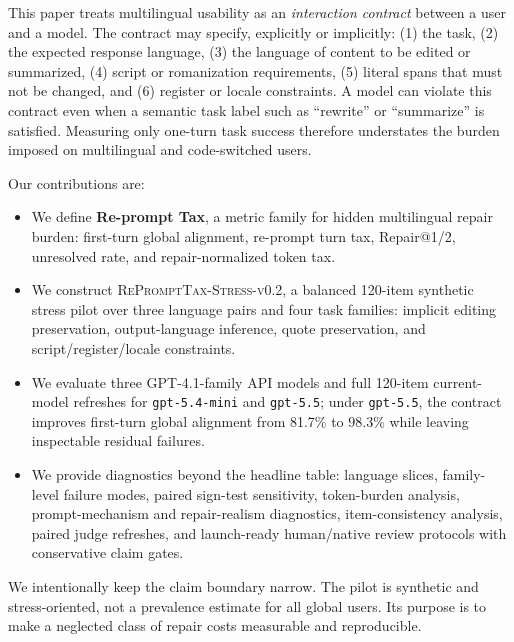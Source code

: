 This paper treats multilingual usability as an \emph{interaction contract}
between a user and a model. The contract may specify, explicitly or implicitly:
(1) the task, (2) the expected response language, (3) the language of content to
be edited or summarized, (4) script or romanization requirements, (5) literal
spans that must not be changed, and (6) register or locale constraints. A model
can violate this contract even when a semantic task label such as ``rewrite'' or
``summarize'' is satisfied. Measuring only one-turn task success therefore
understates the burden imposed on multilingual and code-switched users.

Our contributions are:
\begin{itemize}
    \item We define \textbf{Re-prompt Tax}, a metric family for hidden
    multilingual repair burden: first-turn global alignment, re-prompt turn tax,
    Repair@1/2, unresolved rate, and repair-normalized token tax.
    \item We construct \textsc{RePromptTax-Stress-v0.2}, a balanced 120-item
    synthetic stress pilot over three language pairs and four task families:
    implicit editing preservation, output-language inference, quote
    preservation, and script/register/locale constraints.
    \item We evaluate three GPT-4.1-family API models \citep{openai2025gpt41}
    and full 120-item current-model refreshes for \texttt{gpt-5.4-mini} and
    \texttt{gpt-5.5}; under \texttt{gpt-5.5}, the contract improves first-turn
    global alignment from 81.7\% to 98.3\% while leaving inspectable residual
    failures.
    \item We provide diagnostics beyond the headline table: language slices,
    family-level failure modes, paired sign-test sensitivity, token-burden
    analysis, prompt-mechanism and repair-realism diagnostics, item-consistency
    analysis, paired judge refreshes, and launch-ready human/native review
    protocols with conservative claim gates.
\end{itemize}

We intentionally keep the claim boundary narrow. The pilot is synthetic and
stress-oriented, not a prevalence estimate for all global users. Its purpose is
to make a neglected class of repair costs measurable and reproducible.
